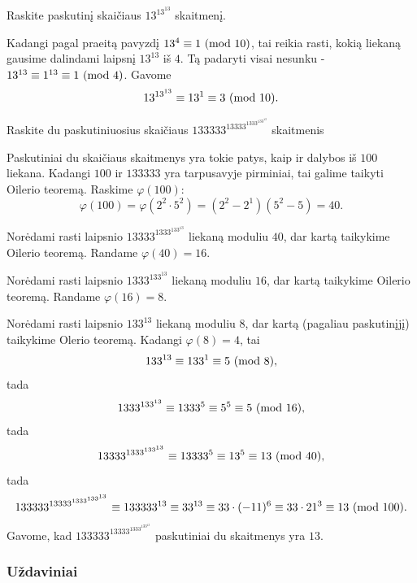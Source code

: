 \begin{pavnr}
  Raskite paskutinį skaičiaus $13^{13^{13}}$ skaitmenį.
\end{pavnr}

\begin{sprendimas}
Kadangi pagal praeitą pavyzdį $13^{4}\equiv 1 \ (\text{mod } 10)$, tai reikia rasti,
kokią liekaną gausime dalindami laipsnį $13^{13}$ iš $4$. Tą padaryti visai
nesunku - $13^{13} \equiv 1^{13} \equiv 1 \ (\text{mod } 4)$. Gavome
$$13^{13^{13}} \equiv 13^1 \equiv 3 \ (\text{mod } 10).$$
\end{sprendimas}

\begin{pavnr}
  Raskite du paskutiniuosius skaičiaus $133333^{13333^{1333^{133^{13}}}}$
  skaitmenis
\end{pavnr}

\begin{sprendimas}
Paskutiniai du skaičiaus skaitmenys yra tokie patys, kaip ir dalybos iš
$100$ liekana. Kadangi $100$ ir $133333$ yra tarpusavyje pirminiai, tai
galime taikyti Oilerio teoremą. Raskime $\varphi(100)$:
$$\varphi(100) = \varphi(2^2\cdot 5^2) = (2^2-2^1)(5^2-5) = 40.$$

Norėdami rasti laipsnio $13333^{1333^{133^{13}}}$ liekaną moduliu
$40$, dar kartą taikykime Oilerio teoremą. Randame $\varphi(40) = 16$.

Norėdami rasti laipsnio $1333^{133^{13}}$ liekaną moduliu $16$, dar kartą
taikykime Oilerio teoremą. Randame $\varphi(16) = 8$.

Norėdami rasti laipsnio $133^{13}$ liekaną moduliu $8$, dar kartą (pagaliau
paskutinįjį) taikykime Olerio teoremą. Kadangi $\varphi(8) = 4$, tai  
$$133^{13}\equiv 133^1 \equiv 5 \ (\text{mod } 8),$$tada 
$$1333^{133^{13}} \equiv 1333^5 \equiv 5^5 \equiv 5 \ (\text{mod } 16),$$tada
$$13333^{1333^{133^{13}}} \equiv 13333^{5} \equiv 13^5 \equiv 13
\ (\text{mod } 40),$$tada
$$133333^{13333^{1333^{133^{13}}}} \equiv 133333^{13} \equiv 33^{13} \equiv
33\cdot (-11)^{6} \equiv 33\cdot 21^{3} \equiv 13  \ (\text{mod } 100).$$
Gavome, kad $133333^{13333^{1333^{133^{13}}}}$ paskutiniai du skaitmenys
yra $13$. 
\end{sprendimas}

\subsubsection{Uždaviniai}

